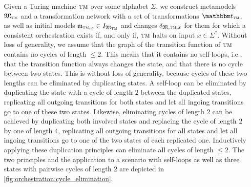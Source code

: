 Given a Turing machine $\textsc{tm}$ over some alphabet $\Sigma$, we construct metamodels $\metamodeltuple{M}_{\TuringMachine}$ and a transformation network with a set of transformations $\transformationset{T}_{\TuringMachine}$, as well as initial models $\modeltuple{m}_{\TuringMachine, x} \in \metamodeltupleinstanceset{M_{\TuringMachine}}$ and changes $\changetuple{\metamodeltuple{M},\TuringMachine,x}$ for them for which a consistent orchestration exists if, and only if, $\textsc{tm}$ halts on input $x \in \Sigma^*$.
Without loss of generality, we assume that the graph of the transition function of $\textsc{tm}$ contains no cycles of length $\leq 2$.
This means that it contains no self-loops, i.e., that the transition function always changes the state, and that there is no cycle between two states.
This is without loss of generality, because cycles of these two lengths can be eliminated by duplicating states.
A self-loop can be eliminated by duplicating the state with a cycle of length $2$ between the duplicated states,  replicating all outgoing transitions for both states and let all ingoing transitions go to one of these two states.
Likewise, eliminating cycles of length $2$ can be achieved by duplicating both involved states and replacing the cycle of length $2$ by one of length $4$, replicating all outgoing transitions for all states and let all ingoing transitions go to one of the two states of each replicated one.
Inductively applying these duplication principles can eliminate all cycles of length $\leq 2$.
The two principles and the application to a scenario with self-loops as well as three states with pairwise cycles of length $2$ are depicted in \autoref{fig:orchestration:cycle_elimination}.

